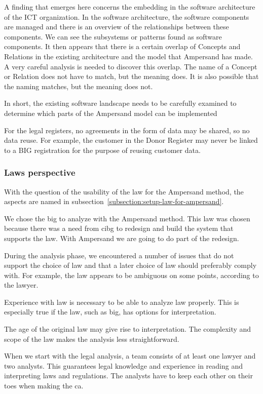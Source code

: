 A finding that emerges here concerns the embedding in the software architecture of the ICT organization.
In the software architecture, the software components are managed and there is an overview of the relationships between these components.
We can see the subsystems or patterns found as software components.
It then appears that there is a certain overlap of Concepts and Relations in the existing architecture and the model that Ampersand has made.
A very careful analysis is needed to discover this overlap.
The name of a Concept or Relation does not have to match, but the meaning does.
It is also possible that the naming matches, but the meaning does not.

In short, the existing software landscape needs to be carefully examined to determine which parts of the Ampersand model can be implemented

For the legal registers, no agreements in the form of data may be shared, so no data reuse.
For example, the customer in the Donor Register may never be linked to a BIG registration for the purpose of reusing customer data.

\subsubsection{Laws perspective}\label{subsub:laws_perspective}
With the question of the usability of the law for the Ampersand method, the aspects are named in subsection~\ref{subsection:setup-law-for-ampersand}.

We chose the \acrshort{big} to analyze with the Ampersand method.
This law was chosen because there was a need from \acrshort{cibg} to redesign and build the system that supports the law.
With Ampersand we are going to do part of the redesign.

During the analysis phase, we encountered a number of issues that do not support the choice of law and that a later choice of law should preferably comply with.
For example, the law appears to be ambiguous on some points, according to the lawyer.

Experience with law is necessary to be able to analyze law properly.
This is especially true if the law, such as \acrshort{big}, has options for interpretation.

The age of the original law may give rise to interpretation.
The complexity and scope of the law makes the analysis less straightforward.

When we start with the legal analysis, a team consists of at least one lawyer and two analysts.
This guarantees legal knowledge and experience in reading and interpreting laws and regulations.
The analysts have to keep each other on their toes when making the \acrlong{ca}.


